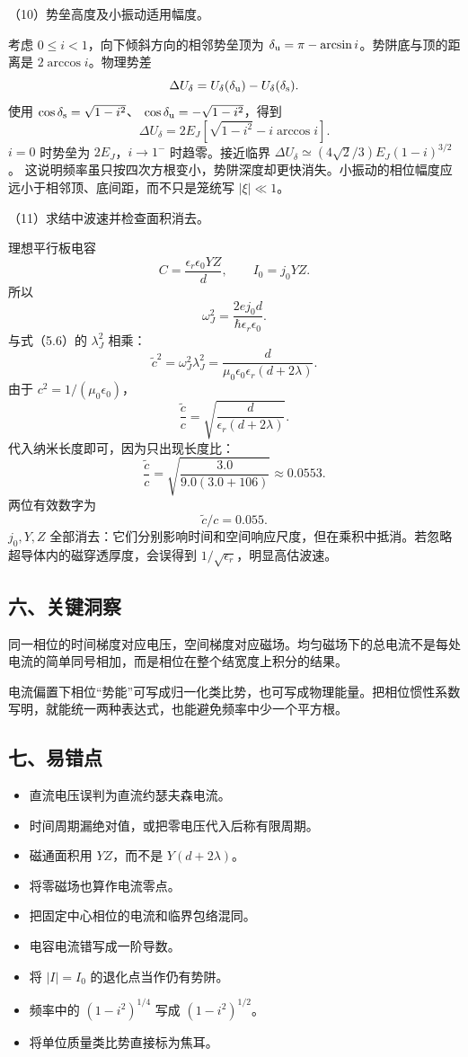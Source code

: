 \documentclass[12pt,a4paper,fontset=fandol]{ctexart}
\providecommand{\tightlist}{\setlength{\itemsep}{0pt}\setlength{\parskip}{0pt}}
\begin{document}
（10）势垒高度及小振动适用幅度。

考虑 \(0\le i<1\)，向下倾斜方向的相邻势垒顶为
\(\delta_{\rm u}=\pi-\arcsin i\)。势阱底与顶的距离是
\(2\arccos i\)。物理势差 \[
\Delta U_\delta
=U_\delta(\delta_{\rm u})-U_\delta(\delta_{\rm s}).
\] 使用 \(\cos\delta_{\rm s}=\sqrt{1-i^2}\)、
\(\cos\delta_{\rm u}=-\sqrt{1-i^2}\)，得到 \[
\boxed{\Delta U_\delta=
2E_J\left[\sqrt{1-i^2}-i\arccos i\right].}\tag{5.12}
\] \(i=0\) 时势垒为 \(2E_J\)，\(i\to1^-\) 时趋零。接近临界
\(\Delta U_\delta\simeq(4\sqrt2/3)E_J(1-i)^{3/2}\)。
这说明频率虽只按四次方根变小，势阱深度却更快消失。小振动的相位幅度应远小于相邻顶、底间距，而不只是笼统写
\(|\xi|\ll1\)。

（11）求结中波速并检查面积消去。

理想平行板电容 \[
C=\frac{\epsilon_r\epsilon_0YZ}{d},\qquad I_0=j_0YZ.
\] 所以 \[
\omega_J^2=\frac{2ej_0d}{\hbar\epsilon_r\epsilon_0}.
\] 与式（5.6）的 \(\lambda_J^2\) 相乘： \[
\tilde c^2=\omega_J^2\lambda_J^2
=\frac{d}{\mu_0\epsilon_0\epsilon_r(d+2\lambda)}.
\] 由于 \(c^2=1/(\mu_0\epsilon_0)\)， \[
\boxed{\frac{\tilde c}{c}
=\sqrt{\frac{d}{\epsilon_r(d+2\lambda)}}.}\tag{5.13}
\] 代入纳米长度即可，因为只出现长度比： \[
\frac{\tilde c}{c}
=\sqrt{\frac{3.0}{9.0(3.0+106)}}\approx0.0553.
\] 两位有效数字为 \[
\boxed{\tilde c/c=0.055.}
\] \(j_0,Y,Z\)
全部消去：它们分别影响时间和空间响应尺度，但在乘积中抵消。若忽略超导体内的磁穿透厚度，会误得到
\(1/\sqrt{\epsilon_r}\)，明显高估波速。

\subsection{六、关键洞察}\label{ux516dux5173ux952eux6d1eux5bdf-4}

同一相位的时间梯度对应电压，空间梯度对应磁场。均匀磁场下的总电流不是每处电流的简单同号相加，而是相位在整个结宽度上积分的结果。

电流偏置下相位``势能''可写成归一化类比势，也可写成物理能量。把相位惯性系数写明，就能统一两种表达式，也能避免频率中少一个平方根。

\subsection{七、易错点}\label{ux4e03ux6613ux9519ux70b9-4}

\begin{itemize}
\tightlist
\item
  直流电压误判为直流约瑟夫森电流。
\item
  时间周期漏绝对值，或把零电压代入后称有限周期。
\item
  磁通面积用 \(YZ\)，而不是 \(Y(d+2\lambda)\)。
\item
  将零磁场也算作电流零点。
\item
  把固定中心相位的电流和临界包络混同。
\item
  电容电流错写成一阶导数。
\item
  将 \(|I|=I_0\) 的退化点当作仍有势阱。
\item
  频率中的 \((1-i^2)^{1/4}\) 写成 \((1-i^2)^{1/2}\)。
\item
  将单位质量类比势直接标为焦耳。
\end{itemize}
\end{document}
